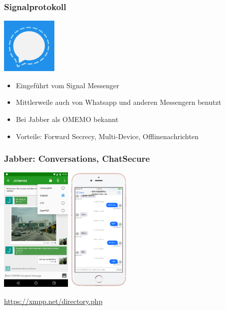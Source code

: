 \begin{frame}
  \frametitle{Signalprotokoll}
  \begin{center}
    \includegraphics[height=0.2\textheight]{img/signal-logo.png}
  \end{center}
  \begin{itemize}
    \item<2->Eingeführt vom Signal Messenger
    \item<3->Mittlerweile auch von Whatsapp und anderen Messengern benutzt
    \item<4->Bei Jabber als OMEMO bekannt
    \item<5->Vorteile: Forward Secrecy, Multi-Device, Offlinenachrichten
  \end{itemize}
\end{frame}

\begin{frame}
  \frametitle{Jabber: Conversations, ChatSecure}
    \begin{center}
      \includegraphics[height=6cm]{img/conversations.jpg}
      \hspace{0.5cm}
      \includegraphics[height=6cm]{img/chatsecure.png}
    \end{center}
    \url{https://xmpp.net/directory.php}
\end{frame}

